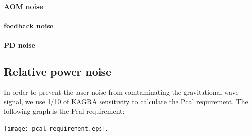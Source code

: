 \paragraph{AOM noise}
\paragraph{feedback noise}
\paragraph{PD noise}


\subsection{Relative power noise}
In order to prevent the laser noise from comtaminating the gravitational wave signal, we use 1/10 of KAGRA sensitivity to calculate the Pcal requirement. The following graph is the Pcal requirement:
\begin{center}
	\texttt{[image: pcal\_requirement.eps]}.
\end{center}


